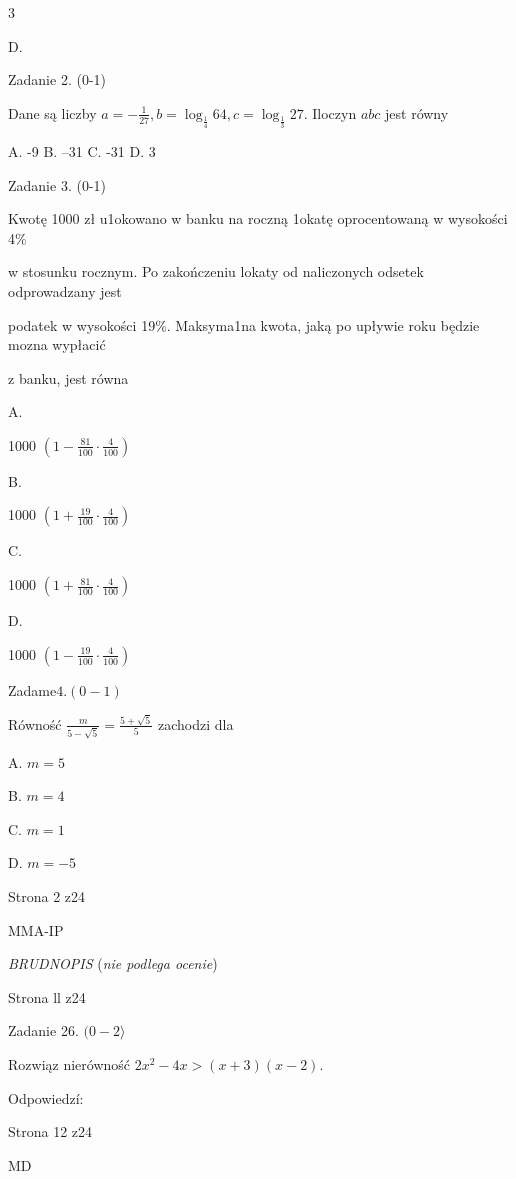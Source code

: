 \documentclass[a4paper,12pt]{article}
\begin{document}
3

D.

Zadanie 2. (0-1)

Dane są liczby $a=-\displaystyle \frac{1}{27}, b=\log_{\frac{1}{4}}64, c=\log_{\frac{1}{3}}27$. Iloczyn $abc$ jest równy

A. -9 B. --31 C. -31 D. 3

Zadanie 3. (0-1)

Kwotę 1000 zł u1okowano w banku na roczną 1okatę oprocentowaną w wysokości 4\%

w stosunku rocznym. Po zakończeniu lokaty od naliczonych odsetek odprowadzany jest

podatek w wysokości 19\%. Maksyma1na kwota, jaką po upływie roku będzie mozna wypłacić

z banku, jest równa

A.

1000 $(1-\displaystyle \frac{81}{100}\cdot\frac{4}{100})$

B.

1000 $(1+\displaystyle \frac{19}{100}\cdot\frac{4}{100})$

C.

1000 $(1+\displaystyle \frac{81}{100}\cdot\frac{4}{100})$

D.

1000 $(1-\displaystyle \frac{19}{100}\cdot\frac{4}{100})$

Zadam$\mathrm{e}4.(0-1)$

Równość $\displaystyle \frac{m}{5-\sqrt{5}}=\frac{5+\sqrt{5}}{5}$ zachodzi dla

A. $m=5$

B. $m=4$

C. $m=1$

D. $m=-5$

Strona 2 z24

MMA-IP





{\it BRUDNOPIS} ({\it nie podlega ocenie})

Strona ll z24





Zadanie 26. $(0-2\rangle$

Rozwiąz nierówność $2x^{2}-4x>(x+3)(x-2).$

Odpowiedzí:

Strona 12 z24

MD
\end{document}
